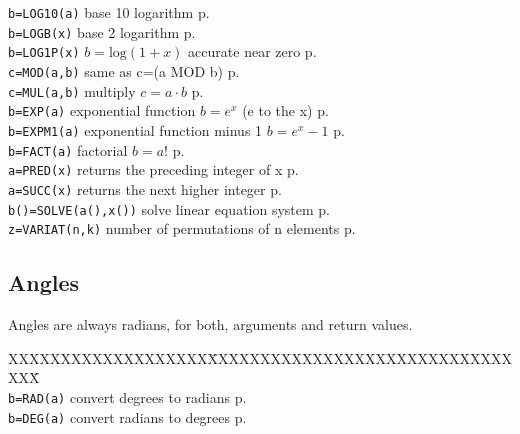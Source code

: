 \begin{tabbing}
\verb|b=LOG10(a)|	\> base 10 logarithm \> p.\pageref{LOG10}\\
\verb|b=LOGB(x)|	\> base 2 logarithm \> p.\pageref{LOGB}\\
\verb|b=LOG1P(x)|	\> $b=\mathrm{log}(1+x)$ accurate near zero\> p.\pageref{LOG1P}\\
\verb|c=MOD(a,b)|	\> same as c=(a MOD b)\> p.\pageref{MOD}\\
\verb|c=MUL(a,b)|	\> multiply $c=a\cdot b$\> p.\pageref{MUL}\\
\verb|b=EXP(a)|		\> exponential function $b=e^x$ (e to the x) \> p.\pageref{EXP}\\
\verb|b=EXPM1(a)|	\> exponential function minus 1 $b=e^x-1$  \> p.\pageref{EXPM1}\\
\verb|b=FACT(a)|	\> factorial $b=a!$\> p.\pageref{FACT}\\
\verb|a=PRED(x)|	\>  returns the preceding integer of x \> p.\pageref{PRED}\\
\verb|a=SUCC(x)|	\>  returns the next higher integer \> p.\pageref{SUCC}\\
\verb|b()=SOLVE(a(),x())|\> solve linear equation system\> p.\pageref{SOLVE} \\
\verb|z=VARIAT(n,k)| \> number of permutations of n elements \> p.\pageref{VARIAT}\\
\end{tabbing}

\subsection{Angles}
Angles are always radians, for both, arguments and return values.

\begin{tabbing}
XXXXXXXXXXXXXXXXXXX\=XXXXXXXXXXXXXXXXXXXXXXXXXXXXXXXX\=\kill\\
\verb|b=RAD(a)|	\> convert degrees to radians\> p.\pageref{RAD} \\
\verb|b=DEG(a)|	\> convert radians to degrees\> p.\pageref{DEG}\\
\end{tabbing}

